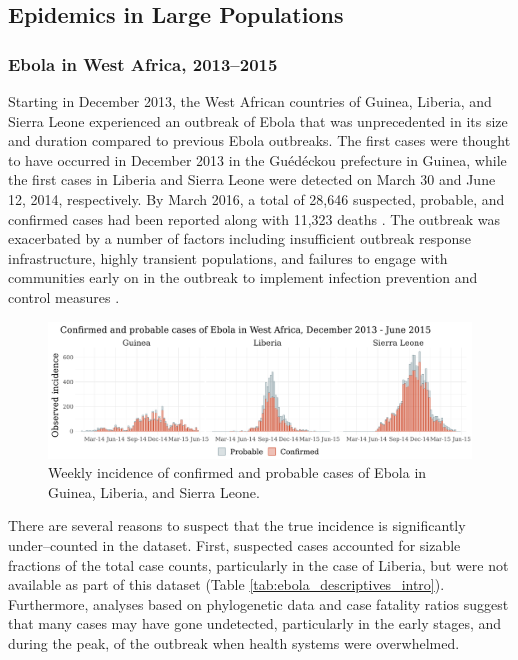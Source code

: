 \subsection{Epidemics in Large Populations}
\label{subsec:largepop}

\subsubsection{Ebola in West Africa, 2013--2015}
\label{subsec:ebola_descrip}

Starting in December 2013, the West African countries of Guinea, Liberia, and Sierra Leone experienced an outbreak of Ebola that was unprecedented in its size and duration compared to previous Ebola outbreaks. The first cases were thought to have occurred in December 2013 in the Gu\'{e}d\'{e}ckou prefecture in Guinea, while the first cases in Liberia and Sierra Leone were detected on March 30 and June 12, 2014, respectively. By March 2016, a total of 28,646 suspected, probable, and confirmed cases had been reported along with 11,323 deaths \cite{who2016situation}. The outbreak was exacerbated by a number of factors including insufficient outbreak response infrastructure, highly transient populations, and failures to engage with communities early on in the outbreak to implement infection prevention and control measures \cite{coltart2017ebola,dudas2017virus}. 

\begin{figure}[htbp]
	\centering
	\includegraphics[width=\linewidth]{figures/ebola_dat}
	\caption{Weekly incidence of confirmed and probable cases of Ebola in Guinea, Liberia, and Sierra Leone.}
	\label{fig:eboladat_intro}
\end{figure}

There are several reasons to suspect that the true incidence is significantly under--counted in the dataset. First, suspected cases accounted for sizable fractions of the total case counts, particularly in the case of Liberia, but were not available as part of this dataset (Table \ref{tab:ebola_descriptives_intro}). Furthermore, analyses based on phylogenetic data \cite{scarpino2014epidemiological} and case fatality ratios \cite{atkins2015under,garske2017heterogeneities} suggest that many cases may have gone undetected, particularly in the early stages, and during the peak, of the outbreak when health systems were overwhelmed. 

